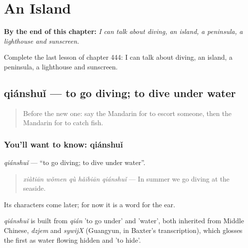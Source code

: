 
\chapter{An Island}
\label{ch:zh-an-island}

\begin{chapteropening}
\textbf{By the end of this chapter:} \emph{I can talk about diving, an island, a peninsula, a lighthouse and sunscreen.}

Complete the last lesson of chapter 444: I can talk about diving, an island, a peninsula, a lighthouse and sunscreen.
\end{chapteropening}

\section[qiánshuǐ]{qiánshuǐ — to go diving; to dive under water}

\label{lesson:ZH-C444-qianshui}



\begin{quote}
Before the new one: say the Mandarin for to escort someone, then the Mandarin for to catch fish.
\end{quote}

\subsection*{You'll want to know: qiánshuǐ}
\emph{qiánshuǐ} — \textquotedblleft{}to go diving; to dive under water\textquotedblright{}.

\begin{quote}
\emph{xiàtiān wǒmen qù hǎibiān qiánshuǐ} — In summer we go diving at the seaside.
\end{quote}

Its characters come later; for now it is a word for the ear.

\begin{cousinweb}
\emph{qiánshuǐ} is built from \emph{qián} 'to go under' and  'water', both inherited from Middle Chinese, \emph{dzjem} and \emph{sywijX} (Guangyun, in Baxter's transcription), which glosses the first as water flowing hidden and 'to hide'.
\end{cousinweb}

